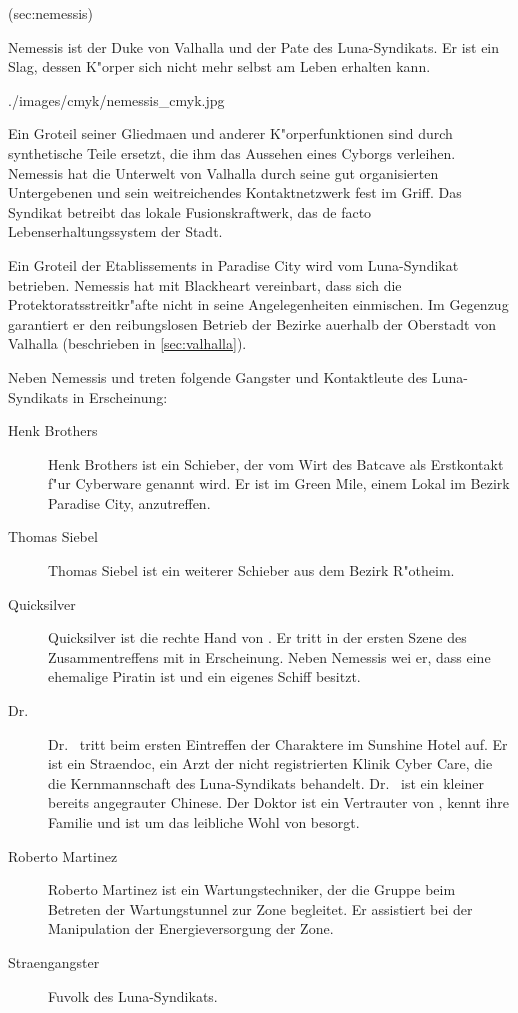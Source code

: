 \anchor(sec:nemessis)

Nemessis ist der Duke von Valhalla und der Pate des Luna-Syndikats. Er ist ein Slag, dessen K"orper sich nicht mehr selbst am Leben erhalten kann.

\begin{sideimagebox}[r]{0.9}{./images/cmyk/nemessis_cmyk.jpg}{}

\end{sideimagebox}

Ein Gro\3teil seiner Gliedma\3en und anderer K"orperfunktionen sind durch synthetische Teile ersetzt, die ihm das Aussehen eines Cyborgs verleihen. Nemessis hat die Unterwelt von Valhalla durch seine gut organisierten Untergebenen und sein weitreichendes Kontaktnetzwerk fest im Griff. Das Syndikat betreibt das lokale Fusionskraftwerk, das de facto Lebenserhaltungssystem der Stadt.

Ein Gro\3teil der Etablissements in Paradise City wird vom Luna-Syndikat betrieben. Nemessis hat mit Blackheart vereinbart, dass sich die Protektoratsstreitkr"afte nicht in seine Angelegenheiten einmischen. Im Gegenzug garantiert er den reibungslosen Betrieb der Bezirke au\3erhalb der Oberstadt von Valhalla (beschrieben in \cref{sec:valhalla}).


Neben Nemessis und \xl{} treten folgende Gangster und Kontaktleute des Luna-Syndikats in Erscheinung:

\begin{description}
    \item [Henk Brothers] Henk Brothers ist ein Schieber, der vom Wirt des Batcave als Erstkontakt f"ur Cyberware genannt wird. Er ist im 
        Green Mile, einem Lokal im Bezirk Paradise City, anzutreffen.
    \item [Thomas Siebel] Thomas Siebel ist ein weiterer Schieber aus dem Bezirk R"otheim.
    \item [Quicksilver] Quicksilver ist die rechte Hand von \xl{}. Er tritt in der ersten Szene des Zusammentreffens mit \xl{} in 
        Erscheinung. Neben Nemessis wei\3 er, dass \xl{} eine ehemalige Piratin ist und ein eigenes Schiff besitzt.
    \item [Dr.~ ] Dr.~  tritt beim ersten Eintreffen der Charaktere im Sunshine Hotel auf. 
        Er ist ein Stra\3endoc, ein Arzt der nicht registrierten Klinik  Cyber Care, die die Kernmannschaft des Luna-Syndikats behandelt. Dr.~  ist ein kleiner bereits angegrauter Chinese. Der Doktor ist ein Vertrauter von \xl{}, kennt ihre Familie und ist um das leibliche Wohl von \xl{} besorgt.
    \item [Roberto Martinez] Roberto Martinez ist ein Wartungstechniker, der die Gruppe beim Betreten der Wartungstunnel zur Zone 
        begleitet. Er assistiert \xl{} bei der Manipulation der Energieversorgung der Zone.
    \item [Stra\3engangster] Fu\3volk des Luna-Syndikats.  
\end{description}

